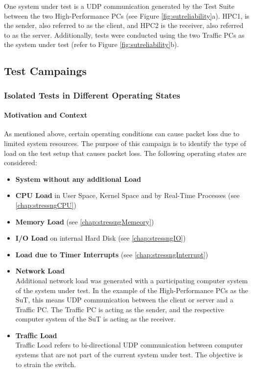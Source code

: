One system under test is a UDP communication generated by the Test Suite between the two High-Performance PCs (see Figure \ref{fig:sutreliability}a). HPC1, is the sender, also referred to as the client, and HPC2 is the receiver, also referred to as the server. Additionally, tests were conducted using the two Traffic PCs as the system under test (refer to Figure \ref{fig:sutreliability}b).

\subsection{Test Campaings}

\subsubsection{Isolated Tests in Different Operating States} \label{chap:relcamp1}
\paragraph{Motivation and Context}

As mentioned above, certain operating conditions can cause packet loss due to limited system resources. The purpose of this campaign is to identify the type of load on the test setup that causes packet loss. The following operating states are considered:

\begin{itemize}
  \item \textbf{System without any additional Load}
  \item \textbf{CPU Load} in User Space, Kernel Space and by Real-Time Processes (see \ref{chap:stressngCPU})
  \item \textbf{Memory Load} (see \ref{chap:stressngMemeory})
  \item \textbf{I/O Load} on internal Hard Disk (see \ref{chap:stressngIO})
  \item \textbf{Load due to Timer Interrupts} (see \ref{chap:stressngInterrupt})
  \item \textbf{Network Load} \\
  		Additional network load was generated with a participating computer system of the system under test. In the example of the High-Performance PCs as the SuT, this means UDP communication between the client or server and a Traffic PC. The Traffic PC is acting as the sender, and the respective computer system of the SuT is acting as the receiver.
  		
  \item \textbf{Traffic Load} \\
 		Traffic Load refers to bi-directional UDP communication between computer systems that are not part of the current system under test. The objective is to strain the switch.
\end{itemize}

